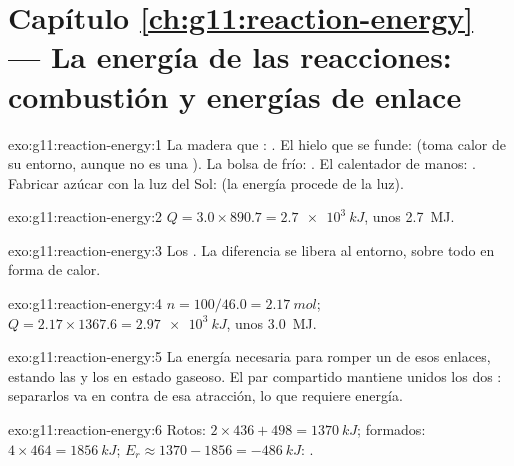 \section*{Capítulo \ref{ch:g11:reaction-energy} --- La energía de las reacciones: combustión y energías de enlace}

\begin{solution}{exo:g11:reaction-energy:1}
La madera que : . El hielo que se funde:  (toma
calor de su entorno, aunque no es una ). La bolsa de
frío: . El calentador de manos: . Fabricar azúcar
con la luz del Sol:  (la energía procede de la luz).
\end{solution}

\begin{solution}{exo:g11:reaction-energy:2}
$Q = 3.0 \times 890.7 = \qty{2.7e3}{kJ}$, unos \qty{2.7}{MJ}.
\end{solution}

\begin{solution}{exo:g11:reaction-energy:3}
Los . La diferencia se libera al entorno, sobre todo en forma
de calor.
\end{solution}

\begin{solution}{exo:g11:reaction-energy:4}
$n = 100 / 46.0 = \qty{2.17}{mol}$; $Q = 2.17 \times 1367.6 =
\qty{2.97e3}{kJ}$, unos \qty{3.0}{MJ}.
\end{solution}

\begin{solution}{exo:g11:reaction-energy:5}
La energía necesaria para romper un  de esos enlaces, estando las
 y los  en estado gaseoso. El par compartido mantiene
unidos los dos : separarlos va en contra de esa atracción, lo que
requiere energía.
\end{solution}

\begin{solution}{exo:g11:reaction-energy:6}
Rotos: $2 \times 436 + 498 = \qty{1370}{kJ}$; formados:
$4 \times 464 = \qty{1856}{kJ}$; $E_r \approx 1370 - 1856 =
\qty{-486}{kJ}$: .
\end{solution}

